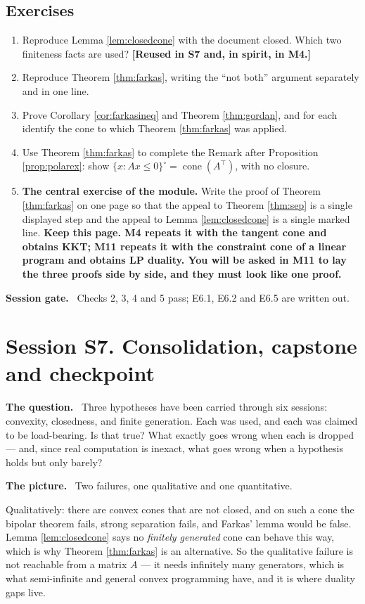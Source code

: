 \documentclass[11pt,a4paper]{article}
\newcommand{\mpart}[1]{\smallskip\noindent\textbf{#1}\ \ignorespaces}
\theoremstyle{definition}
\theoremstyle{plain}
\theoremstyle{remark}
\DeclareMathOperator{\cone}{cone}
\begin{document}
\subsection*{Exercises}
\begin{enumerate}[label=E6.\arabic*]
\item Reproduce Lemma \ref{lem:closedcone} with the document closed. Which two finiteness facts
are used? \textbf{[Reused in S7 and, in spirit, in M4.]}
\item Reproduce Theorem \ref{thm:farkas}, writing the ``not both'' argument separately and in
one line.
\item Prove Corollary \ref{cor:farkasineq} and Theorem \ref{thm:gordan}, and for each identify
the cone to which Theorem \ref{thm:farkas} was applied.
\item Use Theorem \ref{thm:farkas} to complete the Remark after Proposition \ref{prop:polarex}:
show $\{x:Ax\le0\}^\circ=\cone(A^\top)$, with no closure.
\item \textbf{The central exercise of the module.} Write the proof of Theorem \ref{thm:farkas}
on one page so that the appeal to Theorem \ref{thm:sep} is a single displayed step and the
appeal to Lemma \ref{lem:closedcone} is a single marked line. \textbf{Keep this page. M4 repeats
it with the tangent cone and obtains KKT; M11 repeats it with the constraint cone of a linear
program and obtains LP duality. You will be asked in M11 to lay the three proofs side by side,
and they must look like one proof.}
\end{enumerate}

\mpart{Session gate.} Checks 2, 3, 4 and 5 pass; E6.1, E6.2 and E6.5 are written out.

\clearpage

\section{Session S7. Consolidation, capstone and checkpoint}

\mpart{The question.} Three hypotheses have been carried through six sessions: convexity,
closedness, and finite generation. Each was used, and each was claimed to be load-bearing. Is
that true? What exactly goes wrong when each is dropped --- and, since real computation is
inexact, what goes wrong when a hypothesis holds but only barely?

\mpart{The picture.} Two failures, one qualitative and one quantitative.

Qualitatively: there are convex cones that are not closed, and on such a cone the bipolar theorem
fails, strong separation fails, and Farkas' lemma would be false. Lemma \ref{lem:closedcone}
says no \emph{finitely generated} cone can behave this way, which is why Theorem
\ref{thm:farkas} is an alternative. So the qualitative failure is not reachable from a matrix
$A$ --- it needs infinitely many generators, which is what semi-infinite and general convex
programming have, and it is where duality gaps live.
\end{document}
